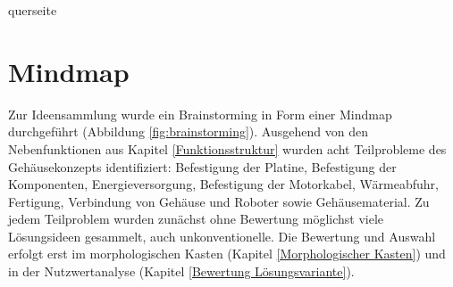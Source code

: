 \documentclass[../main.tex]{subfiles}
\begin{document}
\usetikzlibrary{shapes.multipart,shapes.geometric}   %

\ifcsname querseite\endcsname\else
  \newenvironment{querseite}{%
    \clearpage
    \newgeometry{margin=1cm,top=1.5cm,bottom=1.5cm}%
    \begin{landscape}%
    \thispagestyle{empty}%
  }{%
    \end{landscape}%
    \clearpage
    \restoregeometry
  }
\fi


\section{Mindmap}
\label{Brainstorming}
Zur Ideensammlung wurde ein Brainstorming in Form einer Mindmap durchgeführt (Abbildung \ref{fig:brainstorming}). Ausgehend von den Nebenfunktionen aus Kapitel \ref{Funktionsstruktur} wurden acht Teilprobleme des Gehäusekonzepts identifiziert: Befestigung der Platine, Befestigung der Komponenten, Energieversorgung, Befestigung der Motorkabel, Wärmeabfuhr, Fertigung, Verbindung von Gehäuse und Roboter sowie Gehäusematerial. Zu jedem Teilproblem wurden zunächst ohne Bewertung möglichst viele Lösungsideen gesammelt, auch unkonventionelle. Die Bewertung und Auswahl erfolgt erst im morphologischen Kasten (Kapitel \ref{Morphologischer Kasten}) und in der Nutzwertanalyse (Kapitel \ref{Bewertung Lösungsvariante}).


\end{document}
